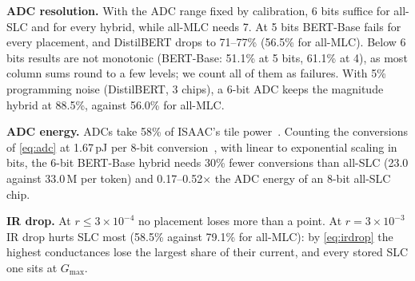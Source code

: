 \textbf{ADC resolution.} With the ADC range fixed by calibration, 6 bits suffice for all-SLC and for every
hybrid, while all-MLC needs 7. At 5 bits BERT-Base fails for every placement, and DistilBERT drops to
71--77\% (56.5\% for all-MLC). Below 6 bits results are not monotonic (BERT-Base: 51.1\% at 5 bits, 61.1\%
at 4), as most column sums round to a few levels; we count all of them as failures. With 5\% programming noise (DistilBERT, 3 chips), a 6-bit ADC keeps the magnitude hybrid at
88.5\%, against 56.0\% for all-MLC.

\textbf{ADC energy.} ADCs take 58\% of ISAAC's tile power~\cite{shafiee2016isaac}. Counting the
conversions of \cref{eq:adc} at 1.67\,pJ per 8-bit conversion~\cite{shafiee2016isaac,murmann2015adc},
with linear to exponential scaling in bits, the 6-bit BERT-Base hybrid needs 30\% fewer conversions than
all-SLC (23.0 against 33.0\,M per token) and 0.17--0.52$\times$ the ADC energy of an 8-bit all-SLC chip.

\textbf{IR drop.} At $r\leq3\times10^{-4}$ no placement loses more than a point. At $r=3\times10^{-3}$ IR
drop hurts SLC most (58.5\% against 79.1\% for all-MLC): by \cref{eq:irdrop} the highest conductances
lose the largest share of their current, and every stored SLC one sits at $G_{\max}$.


